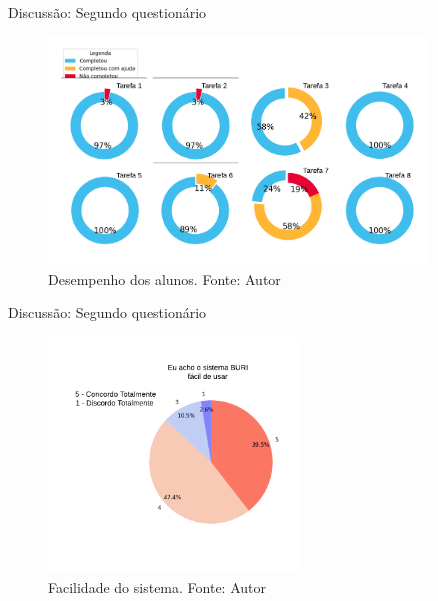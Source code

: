 \documentclass[12pt]{beamer}
\begin{document}
    \begin{frame}{Discussão: Segundo questionário}
        \begin{figure}[ht]
            \centering
            \includegraphics[width=0.90\textwidth]{./img/grafico-tarefas-teste-buri.png}
            \caption{Desempenho dos alunos. Fonte: Autor}\label{fig:atvBuri}
        \end{figure}
    \end{frame}

    \begin{frame}{Discussão: Segundo questionário}
        \begin{figure}[ht]
            \centering
            \includegraphics[width=0.60\textwidth]{./img/grafico-sistema-eh-facil-usar.png}
            \caption{Facilidade do sistema. Fonte: Autor}\label{fig:buriFacilDeUsar}
        \end{figure}
    \end{frame}
\end{document}
